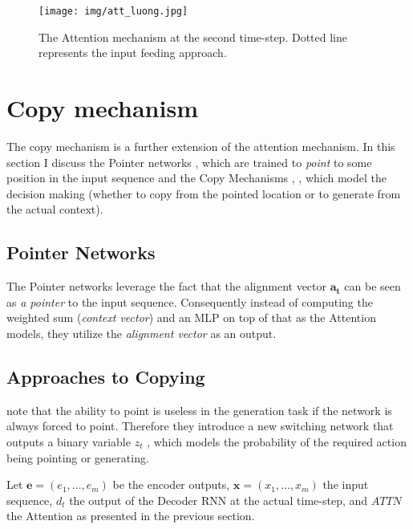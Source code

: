 \begin{figure}[!h]
    \centering
    \texttt{[image: img/att\_luong.jpg]}
    \caption{\centering The Attention mechanism at the second time-step. Dotted line represents the input feeding approach.} \label{input_feeding_attention}
\end{figure}


\section{Copy mechanism} \label{section:copy_mechanism}
The copy mechanism is a further extension of the attention mechanism. In this section I discuss the Pointer networks \citep{vinyals2015pointer}, which are trained to \emph{point} to some position in the input sequence and the Copy Mechanisms \citep{gulcehre2016pointing}, \citep{gu2016incorporating}, \citep{yang2016referenceaware} which model the decision making (whether to copy from the pointed location or to generate from the actual context).

\subsection{Pointer Networks}

The Pointer networks \citep{vinyals2015pointer} leverage the fact that the alignment vector $\boldsymbol{a_t}$  can be seen as \emph{a pointer} to the input sequence. Consequently instead of computing the weighted sum (\emph{context vector}) and an MLP on top of that as the Attention models, they utilize the \emph{alignment vector} as an output.

\subsection{Approaches to Copying}

\citep{gulcehre2016pointing} note that the ability to point is useless in the generation task if the network is always forced to point. Therefore they introduce a new switching network that outputs a binary variable $z_t$ , which models the probability of the required action being pointing or generating.

Let $\boldsymbol{e} = (e_1, \dots, e_m)$ be the encoder outputs, $\boldsymbol{x} = (x_1, \dots, x_m)$ the input sequence, $d_t$ the output of the Decoder RNN at the actual time-step, and $ATTN$ the Attention as presented in the previous section.

